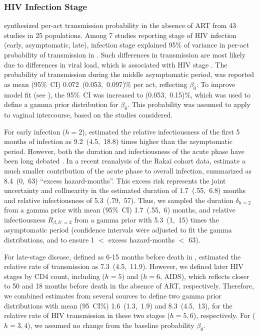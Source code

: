 \subsubsection{HIV Infection Stage}\label{mod.par.beta.hiv}
\citet{Boily2009} synthesized per-act transmission probability in the absence of ART
from 43 studies in 25 populations.
Among 7 studies reporting stage of HIV infection (early, asymptomatic, late),
infection stage explained 95\% of variance
in per-act probability of transmission in \cite{Boily2009}.
Such differences in transmission are most likely due to differences in viral load,
which is associated with HIV stage \cite{Saag1996,Donnell2010}.
The probability of transmission during the middle asymptomatic period,
was reported as mean (95\%~CI) 0.072~(0.053,~0.097)\% per act, reflecting $\beta_0$.
To improve model fit (see ), the 95\%~CI was increased to (0.053,~0.15)\%,
which was used to define a gamma prior distribution for $\beta_0$.
This probability was assumed to apply to vaginal intercourse,
based on the studies considered.
\par
For early infection ($h=2$), \citet{Boily2009} estimated
the relative infectiousness of the first 5 months of infection
as 9.2~(4.5,~18.8) times higher than the asymptomatic period.
However, both the duration and infectiousness of the acute phase
have been long debated \cite{Hollingsworth2008,Cohen2011ahi,Cohen2012}.
In a recent reanalysis of the Rakai cohort data, \citet{Bellan2015} estimate
a much smaller contribution of the acute phase to overall infection,
summarized as 8.4~(0,~63) ``excess hazard-months''.
This excess risk represents the joint uncertainty and collinearity in the estimated
duration of 1.7~(.55,~6.8) months and relative infectiousness of 5.3~(.79,~57).
Thus, we sampled the duration $\delta_{h=2}$ from
a gamma prior with mean (95\%~CI) 1.7~(.55,~6) months,
and relative infectiousness $R_{\beta,h'=2}$ from
a gamma prior with 5.3~(1,~15) times the asymptomatic period
(confidence intervals were adjusted to fit the gamma distributions,
and to ensure 1 $<$ excess hazard-months $<$ 63).
\par
For late-stage disease, defined as 6-15 months before death in \cite{Boily2009},
\citeauthor{Boily2009} estimated the relative rate of transmission as 7.3~(4.5,~11.9).
However, we defined later HIV stages by CD4 count, including
 ($h=5$) and  ($h=6$, AIDS),
which reflects closer to 50 and 18 months before death in the absence of ART, respectively.
Therefore, we combined estimates from several sources
\cite{Wawer2005,Boily2009,Donnell2010} to define two gamma prior distributions
with mean (95~CI\%) 1.6~(1.3,~1.9) and 8.3~(4.5,~13),
for the relative rate of HIV transmission in these two stages ($h=5,6$), respectively.
For  ($h=3,4$), we assumed no change from the baseline probability $\beta_0$.
